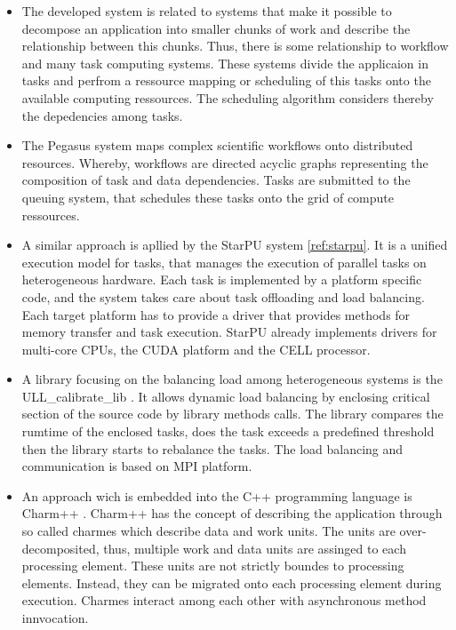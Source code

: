 \begin{itemize}
\item The developed system is related to systems that
  make it possible to decompose an application into smaller
  chunks of work and describe the relationship between this chunks.
  Thus, there is some relationship to workflow and many task
  computing systems. These systems divide the applicaion in tasks
  and perfrom a ressource mapping or scheduling of this tasks
  onto the available computing ressources. The scheduling 
  algorithm considers thereby the depedencies among tasks.

  \item The Pegasus system \cite{ref:pegasus} maps complex scientific
  workflows onto distributed resources. Whereby, workflows are
  directed acyclic graphs representing the composition of task and
  data dependencies. Tasks are submitted to the queuing system, that
  schedules these tasks onto the grid of compute ressources.

\item A similar approach is apllied by the StarPU system
  \ref{ref:starpu}.  It is a unified execution model for tasks, that
  manages the execution of parallel tasks on heterogeneous hardware.
  Each task is implemented by a platform specific code, and the system
  takes care about task offloading and load balancing. Each target
  platform has to provide a driver that provides methods for memory
  transfer and task execution. StarPU already implements drivers for
  multi-core CPUs, the CUDA platform and the CELL processor.

\item A library focusing on the balancing load among heterogeneous
  systems is the ULL\_calibrate\_lib \cite{ref:ull_calibrate_lib}. It
  allows dynamic load balancing by enclosing critical section of the
  source code by library methods calls. The library compares the rumtime
  of the enclosed tasks, does the task exceeds a predefined threshold
  then the library starts to rebalance the tasks. The load balancing
  and communication is based on MPI platform.

\item An approach wich is embedded into the C++ programming language
  is Charm++ \cite{ref:charm++}. Charm++ has the concept of describing
  the application through so called charmes which describe data and
  work units. The units are over-decomposited, thus, multiple work and
  data units are assinged to each processing element. These units are
  not strictly boundes to processing elements. Instead, they can be
  migrated onto each processing element during execution. Charmes
  interact among each other with asynchronous method innvocation.


\end{itemize}
